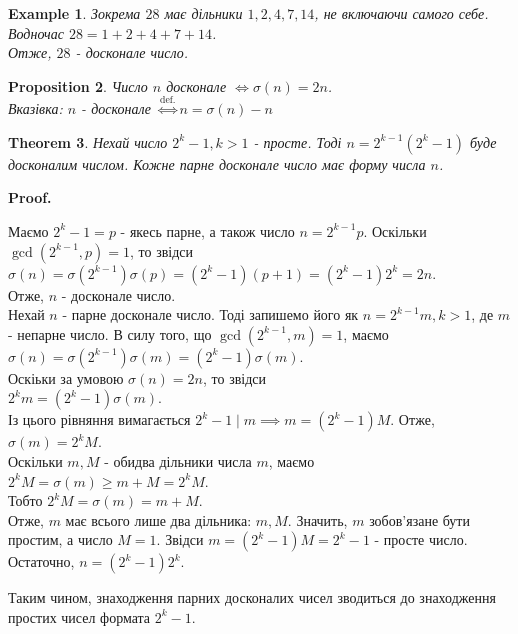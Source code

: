 \documentclass[a4paper, 14pt]{extarticle}
\makeatletter
\theoremstyle{theoremdd}
\newtheorem{theorem}{Theorem}[subsection]
\theoremstyle{theoremdd}
\theoremstyle{theoremdd}
\theoremstyle{theoremdd}
\newtheorem{example}[theorem]{Example}
\theoremstyle{theoremdd}
\newtheorem{proposition}[theorem]{Proposition}
\theoremstyle{theoremdd}
\theoremstyle{theoremdd}
\theoremstyle{theoremdd}
\def\qed{$\blacksquare$}
\renewenvironment{proof}[1][Proof.\\]{\par
\pushQED{\hfill \qed}%
\normalfont \topsep6\p@\@plus6\p@\relax
\trivlist
\item\relax
{\bfseries
#1\@addpunct{.}}\hspace\labelsep\ignorespaces
}{%
\popQED\endtrivlist\@endpefalse
}
\makeatother
\begin{document}
\begin{example}
Зокрема $28$ має дільники $1,2,4,7,14$, не включаючи самого себе. Водночас $28 = 1 + 2 + 4 + 7 + 14$.\\
Отже, $28$ - досконале число.
\end{example}

\begin{proposition}
Число $n$ досконале $\iff \sigma(n) = 2n$.\\
\textit{Вказівка: $n$ - досконале} $\overset{\text{def.}}{\iff} n = \sigma(n)-n$
\end{proposition}

\begin{theorem}
Нехай число $2^k-1,k>1$ - просте. Тоді $n = 2^{k-1}(2^k-1)$ буде досконалим числом. Кожне парне досконале число має форму числа $n$.
\end{theorem}

\begin{proof}
Маємо $2^k-1 = p$ - якесь парне, а також число $n = 2^{k-1}p$. Оскільки $\gcd(2^{k-1},p) = 1$, то звідси\\
$\sigma(n) = \sigma(2^{k-1})\sigma(p) = (2^k-1)(p+1) = (2^k-1)2^k = 2n$.\\
Отже, $n$ - досконале число.
\bigskip \\
Нехай $n$ - парне досконале число. Тоді запишемо його як $n = 2^{k-1}m, k>1$, де $m$ - непарне число. В силу того, що $\gcd(2^{k-1},m) = 1$, маємо\\
$\sigma(n) = \sigma(2^{k-1})\sigma(m) = (2^k-1)\sigma(m)$.\\
Оскіьки за умовою $\sigma(n) = 2n$, то звідси\\
$2^k m = (2^k-1)\sigma(m)$.\\
Із цього рівняння вимагається $2^k-1 \mid m \implies m = (2^k-1)M$. Отже,\\
$\sigma(m) = 2^k M$.\\
Оскільки $m,M$ - обидва дільники числа $m$, маємо\\
$2^k M = \sigma(m) \geq m+M = 2^kM$.\\
Тобто $2^kM = \sigma(m) = m+M$.\\
Отже, $m$ має всього лише два дільника: $m,M$. Значить, $m$ зобов'язане бути простим, а число $M = 1$. Звідси $m = (2^k-1)M = 2^k-1$ - просте число. Остаточно, $n = (2^k-1)2^k$.
\end{proof}

Таким чином, знаходження парних досконалих чисел зводиться до знаходження простих чисел формата $2^k - 1$.
\end{document}
